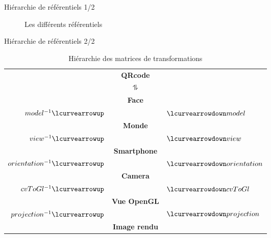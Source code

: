 \documentclass{beamer}
\newcommand*{\rootPath}{}
\begin{document}
\begin{frame}{Hiérarchie de référentiels 1/2}
	\begin{figure}[!ht]
		\centering
		
		\caption{Les différents référentiels}
		\label{fig:tikz:spaceHierarchie}
	\end{figure}	
\end{frame}	

\begin{frame}{Hiérarchie de référentiels 2/2}
	\begin{table}[!ht]
		\centering
		\begin{tabular}{rcl}
																				& \textbf{QRcode}				&																\\
			$ $																& $\updownharpoons$			& $ $														\\
																				& \textbf{Face}					&																\\
			$model^{-1}				\lcurvearrowup$	&												& $\lcurvearrowdown model$			\\
																				& \textbf{Monde}				&																\\
			$view^{-1}				\lcurvearrowup$	& 											& $\lcurvearrowdown view$				\\
																				& \textbf{Smartphone}		&																\\
			$orientation^{-1}	\lcurvearrowup$	& 											& $\lcurvearrowdown orientation$\\
																				& \textbf{Camera}				&																\\
			$cvToGl^{-1}			\lcurvearrowup$	& 											& $\lcurvearrowdown cvToGl $		\\
																				& \textbf{Vue OpenGL}		&																\\
			$projection^{-1}	\lcurvearrowup$	&												& $\lcurvearrowdown projection$	\\
																				& \textbf{Image rendu}	&
		\end{tabular}
		\caption{Hiérarchie des matrices de transformations}
		\label{ref:table:hierarchie}
	\end{table}
\end{frame}
\end{document}
